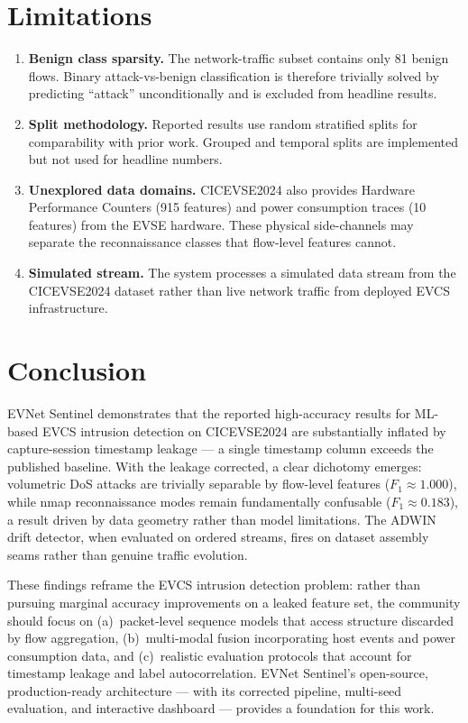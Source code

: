 \documentclass[conference]{IEEEtran}
\begin{document}
\section{Limitations}

\begin{enumerate}
    \item \textbf{Benign class sparsity.} The network-traffic subset contains only 81 benign flows. Binary attack-vs-benign classification is therefore trivially solved by predicting ``attack'' unconditionally and is excluded from headline results.
    \item \textbf{Split methodology.} Reported results use random stratified splits for comparability with prior work. Grouped and temporal splits are implemented but not used for headline numbers.
    \item \textbf{Unexplored data domains.} CICEVSE2024 also provides Hardware Performance Counters (915 features) and power consumption traces (10 features) from the EVSE hardware. These physical side-channels may separate the reconnaissance classes that flow-level features cannot.
    \item \textbf{Simulated stream.} The system processes a simulated data stream from the CICEVSE2024 dataset rather than live network traffic from deployed EVCS infrastructure.
\end{enumerate}

\section{Conclusion}

EVNet Sentinel demonstrates that the reported high-accuracy results for ML-based EVCS intrusion detection on CICEVSE2024 are substantially inflated by capture-session timestamp leakage --- a single timestamp column exceeds the published baseline. With the leakage corrected, a clear dichotomy emerges: volumetric DoS attacks are trivially separable by flow-level features ($F_1 \approx 1.000$), while nmap reconnaissance modes remain fundamentally confusable ($F_1 \approx 0.183$), a result driven by data geometry rather than model limitations. The ADWIN drift detector, when evaluated on ordered streams, fires on dataset assembly seams rather than genuine traffic evolution.

These findings reframe the EVCS intrusion detection problem: rather than pursuing marginal accuracy improvements on a leaked feature set, the community should focus on (a)~packet-level sequence models that access structure discarded by flow aggregation, (b)~multi-modal fusion incorporating host events and power consumption data, and (c)~realistic evaluation protocols that account for timestamp leakage and label autocorrelation. EVNet Sentinel's open-source, production-ready architecture --- with its corrected pipeline, multi-seed evaluation, and interactive dashboard --- provides a foundation for this work.
\end{document}

